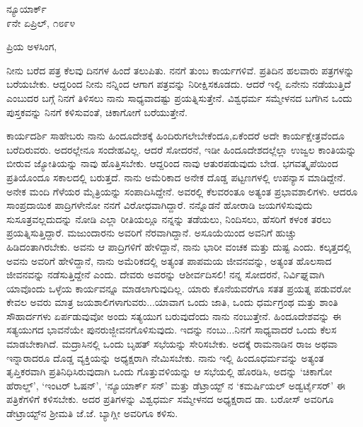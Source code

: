 \vspace{-0.7cm}

\begin{flushright}
ನ್ಯೂಯಾರ್ಕ್\\೯ನೇ ಏಪ್ರಿಲ್, ೧೮೯೪
\end{flushright}

\vspace{-0.7cm}

\noindent
ಪ್ರಿಯ ಅಳಸಿಂಗ,

ನೀನು ಬರೆದ ಪತ್ರ ಕೆಲವು ದಿನಗಳ ಹಿಂದೆ ತಲುಪಿತು. ನನಗೆ ತುಂಬ ಕಾರ್ಯಗಳಿವೆ. ಪ್ರತಿದಿನ ಹಲವಾರು ಪತ್ರಗಳನ್ನು ಬರೆಯಬೇಕು. ಆದ್ದರಿಂದ ನೀನು ನನ್ನಿಂದ ಆಗಾಗ ಪತ್ರವನ್ನು ನಿರೀಕ್ಷಿಸಕೂಡದು. ಆದರೆ ಇಲ್ಲಿ ಏನೇನು ನಡೆಯುತ್ತಿದೆ ಎಂಬುದರ ಬಗ್ಗೆ ನಿನಗೆ ತಿಳಿಸಲು ನಾನು ಸಾಧ್ಯವಾದಷ್ಟು ಪ್ರಯತ್ನಿಸುತ್ತೇನೆ. ವಿಶ್ವಧರ್ಮ ಸಮ್ಮೇಳನದ ಬಗೆಗಿನ ಒಂದು ಪುಸ್ತಕವನ್ನು ನಿನಗೆ ಕಳಿಸುವಂತೆ, ಚಿಕಾಗೋಗೆ ಬರೆಯುತ್ತೇನೆ.

ಕಾರ್ಯದರ್ಶಿ ಸಾಹೇಬರು ನಾನು ಹಿಂದೂದೇಶಕ್ಕೆ ಹಿಂದಿರುಗಲೇಬೇಕೆಂದೂ,\break ಏಕೆಂದರೆ ಅದೇ ಕಾರ್ಯಕ್ಷೇತ್ರವೆಂದೂ ಬರೆದಿರುವರು. ಅದರಲ್ಲೇನೂ ಸಂದೇಹವಿಲ್ಲ. ಆದರೆ ಸೋದರನೆ, ಇಡೀ ಹಿಂದೂದೇಶದಲ್ಲೆಲ್ಲಾ ಉಜ್ವಲ ಕಾಂತಿಯನ್ನು ಬೀರುವ ಜ್ಯೋತಿಯನ್ನು ನಾವು ಹೊತ್ತಿಸಬೇಕು. ಆದ್ದರಿಂದ ನಾವು ಆತುರಪಡುವುದು ಬೇಡ. ಭಗವತ್ಕೃಪೆಯಿಂದ ಪ್ರತಿಯೊಂದೂ ಸಕಾಲದಲ್ಲಿ ಬರುತ್ತದೆ. ನಾನು ಅಮೆರಿಕಾದ ಅನೇಕ ದೊಡ್ಡ ಪಟ್ಟಣಗಳಲ್ಲಿ ಉಪನ್ಯಾಸ ಮಾಡಿದ್ದೇನೆ. ಅನೇಕ ಮಂದಿ ಗೆಳೆಯರ ಮೈತ್ರಿಯನ್ನು ಸಂಪಾದಿಸಿದ್ದೇನೆ. ಅವರಲ್ಲಿ ಕೆಲವರಂತೂ ಅತ್ಯಂತ ಪ್ರಭಾವಶಾಲಿಗಳು. ಆದರೂ ಸಾಂಪ್ರದಾಯಿಕ ಪಾದ್ರಿಗಳೇನೋ ನನಗೆ ವಿರೋಧವಾಗಿದ್ದಾರೆ. ನನ್ನೊಡನೆ ಹೋರಾಡಿ ಜಯಗಳಿಸುವುದು ಸುಸೂತ್ರವಲ್ಲದುದನ್ನು ನೋಡಿ ಎಲ್ಲಾ ರೀತಿಯಲ್ಲೂ ನನ್ನನ್ನು ತಡೆಯಲು, ನಿಂದಿಸಲು, ಹೆಸರಿಗೆ ಕಳಂಕ ತರಲು ಪ್ರಯತ್ನಿಸುತ್ತಿದ್ದಾರೆ. ಮಜುಂದಾರನು ಅವರಿಗೆ ನೆರವಾಗಿದ್ದಾನೆ. ಅಸೂಯೆಯಿಂದ ಅವನಿಗೆ ಹುಚ್ಚು ಹಿಡಿದಂತಾಗಿರಬೇಕು. ಅವನು ಆ ಪಾದ್ರಿಗಳಿಗೆ ಹೇಳಿದ್ದಾನೆ, ನಾನು ಭಾರೀ ವಂಚಕ ಮತ್ತು ದುಷ್ಟ ಎಂದು. ಕಲ್ಕತ್ತದಲ್ಲಿ ಅವನು ಅವರಿಗೆ ಹೇಳಿದ್ದಾನೆ, ನಾನು ಅಮೆರಿಕದಲ್ಲಿ ಅತ್ಯಂತ ಪಾಪಮಯ ಜೀವನವನ್ನು, ಅತ್ಯಂತ ಹೊಲಸಾದ ಜೀವನವನ್ನು ನಡೆಸುತ್ತಿದ್ದೇನೆ ಎಂದು. ದೇವರು ಅವರನ್ನು ಆಶೀರ್ವದಿಸಲಿ! ನನ್ನ ಸೋದರನೆ, ನಿರ್ವಿಘ್ನವಾಗಿ ಯಾವೊಂದು ಒಳ್ಳೆಯ ಕಾರ್ಯವನ್ನೂ ಮಾಡಲಾಗುವುದಿಲ್ಲ. ಯಾರು ಕೊನೆಯವರೆಗೂ ಸತತ ಪ್ರಯತ್ನ ಪಡುವರೋ ಕೇವಲ ಅವರು ಮಾತ್ರ ಜಯಶಾಲಿಗಳಾಗುವರು...ಯಾವಾಗ ಒಂದು ಜಾತಿ, ಒಂದು ಧರ್ಮಗ್ರಂಥ ಮತ್ತು ಶಾಂತಿ ಸೌಹಾರ್ದಗಳು ಏರ್ಪಡುವುವೋ ಅಂದು ಸತ್ಯಯುಗ ಬರುವುದೆಂದು ನಾನು ನಂಬುತ್ತೇನೆ. ಹಿಂದೂದೇಶವನ್ನು ಈ ಸತ್ಯಯುಗದ ಭಾವನೆಯೇ ಪುನರುಜ್ಜೀವನಗೊಳಿಸುವುದು. ಇದನ್ನು ನಂಬು...ನಿನಗೆ ಸಾಧ್ಯವಾದರೆ ಒಂದು ಕೆಲಸ ಮಾಡಬೇಕಾಗಿದೆ. ಮದ್ರಾಸಿನಲ್ಲಿ ಒಂದು ಬೃಹತ್ ಸಭೆಯನ್ನು ಸೇರಿಸಬೇಕು. ಅದಕ್ಕೆ ರಾಮನಾಡಿನ ರಾಜ ಅಥವಾ ಇನ್ನಾರಾದರೂ ದೊಡ್ಡ ವ್ಯಕ್ತಿಯನ್ನು ಅಧ್ಯಕ್ಷರಾಗಿ ನೇಮಿಸಬೇಕು. ನಾನು ಇಲ್ಲಿ ಹಿಂದೂಧರ್ಮವನ್ನು ಅತ್ಯಂತ ತೃಪ್ತಿಕರವಾಗಿ ಪ್ರತಿನಿಧಿಸಿರುವುದಾಗಿ ಒಂದು ಗೊತ್ತುವಳಿಯನ್ನು ಆ ಸಭೆಯಲ್ಲಿ ಹೊರಡಿಸಿ, ಅದನ್ನು ‘ಚಿಕಾಗೋ ಹೆರಾಲ್ಡ್’, ‘ಇಂಟರ್ ಓಷನ್’, ‘ನ್ಯೂಯಾರ್ಕ್ ಸನ್’ ಮತ್ತು ಡೆಟ್ರಾಯ್ಟ್ ನ ‘ಕಮರ್ಷಿಯಲ್‌ ಅಡ್ವರ್ಟೈಸರ್’ \enginline{-}ಈ ಪತ್ರಿಕೆಗಳಿಗೆ ಕಳಿಸಬೇಕು. ಅದರ ಪ್ರತಿಗಳನ್ನು ವಿಶ್ವಧರ್ಮ ಸಮ್ಮೇಳನದ ಅಧ್ಯಕ್ಷರಾದ ಡಾ. ಬರೋಸ್ ಅವರಿಗೂ ಡೇಟ್ರಾಯ್ಟ್‌ನ ಶ‍್ರೀಮತಿ ಜೆ.ಜೆ. ಬ್ಯಾಗ್ಲೀ ಅವರಿಗೂ ಕಳಿಸು.


